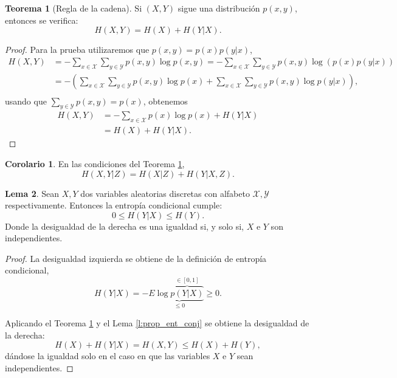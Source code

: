 \documentclass[10pt,a4paper]{article} %
\theoremstyle{definition}
\newtheorem{theorem}{Teorema}[section]
\newtheorem{lemma}[theorem]{Lema}
\newtheorem{corollary}{Corolario}[theorem]
\begin{document}

\begin{theorem}[Regla de la cadena]\label{t:regla_cadena}
  Si $(X,Y)$ sigue una distribución $p(x,y)$, entonces se verifica:\[
H(X,Y) = H(X) + H(Y|X).
  \]
\end{theorem}

\begin{proof}
Para la prueba utilizaremos que $p(x,y) = p(x)p(y|x)$,
  \begin{align*}
    H(X,Y) &= - \sum_{x \in \mathcal{X}} \sum_{y \in \mathcal{Y}} p(x,y) \log p(x,y) = - \sum_{x \in \mathcal{X}} \sum_{y \in \mathcal{Y}} p(x,y) \log \left( p(x)p(y|x) \right )\\
    &= - \left(\sum_{x \in \mathcal{X}} \sum_{y \in \mathcal{Y}} p(x,y) \log p(x) + \sum_{x \in \mathcal{X}} \sum_{y \in \mathcal{Y}} p(x,y) \log p(y|x) \right ),\\
  \end{align*}
usando que $\sum_{y\in \mathcal{Y}}p(x,y) = p(x)$, obtenemos
\begin{align*}
  H(X,Y) &= - \sum_{x \in \mathcal{X}} p(x) \log p(x) + H(Y|X)\\
    &= H(X) + H(Y|X).
  \end{align*}
\end{proof}

\begin{corollary} En las condiciones del Teorema \ref{t:regla_cadena},\[
H(X,Y|Z) = H(X|Z) + H(Y|X, Z).
  \]
\end{corollary}

\begin{lemma}
  Sean $X, Y$ dos variables aleatorias discretas con alfabeto $\mathcal{X}, \mathcal{Y}$ respectivamente. Entonces la entropía condicional cumple:\[
0 \leq H(Y|X) \leq H(Y).
\]
Donde la desigualdad de la derecha es una igualdad si, y solo si, $X$ e $Y$ son independientes.
\end{lemma}

\begin{proof}
  La desigualdad izquierda se obtiene de la definición de entropía condicional, \[H(Y|X) = - E \underbrace{\log \overbrace{p(Y|X)}^{\in [0,1]}}_{\leq 0} \ge 0.\]

  Aplicando el Teorema \ref{t:regla_cadena} y el Lema \ref{l:prop_ent_conj} se obtiene la desigualdad de la derecha:\[
H(X) + H(Y|X) = H(X,Y) \leq H(X) + H(Y),
\]
dándose la igualdad solo en el caso en que las variables $X$ e $Y$ sean independientes.
\end{proof}
\end{document}
